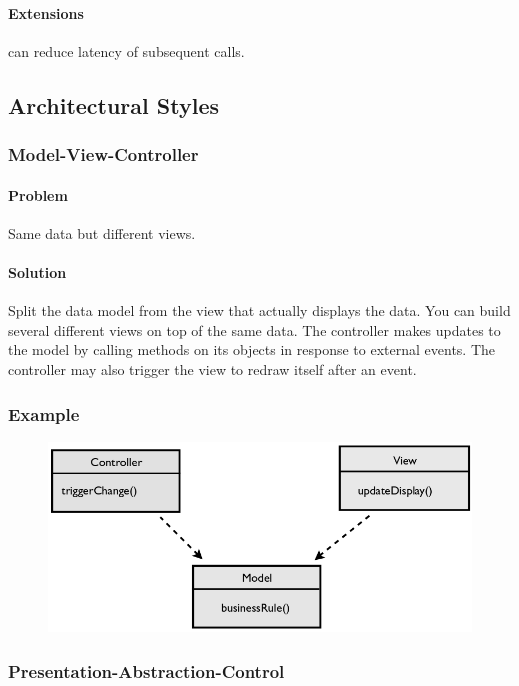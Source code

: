 \documentclass[twocolumn,english]{article}
\let\emph\relax
\begin{document}
\paragraph{Extensions}

\emph{Caching} can reduce latency of subsequent calls.


\subsection{Architectural Styles}


\subsubsection{Model-View-Controller}


\paragraph{Problem}

Same data but different views.


\paragraph{Solution}

Split the data model from the view that actually displays the data. You can build several different views on top of the same data. The controller makes updates to the model by calling methods on its objects in response to external events. The controller may also trigger the view to redraw itself after an event.


\subsubsection*{Example}

\begin{figure}[H]
\centering{}\includegraphics[width=0.45\columnwidth]{img/mvc} 
\end{figure}



\subsubsection{Presentation-Abstraction-Control}
\end{document}
